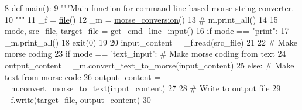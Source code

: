 \begin{DoxyCode}
8 \textcolor{keyword}{def }\mbox{\hyperlink{namespacemorse__main_a76d936650259b2059dd69cfe7a501ff8}{main}}():
9     \textcolor{stringliteral}{"""Main function for command line based morse string converter.}
10 \textcolor{stringliteral}{    """}
11     \_f = \mbox{\hyperlink{namespacefile}{file}}()
12     \_m = \mbox{\hyperlink{namespacemorse__conversion}{morse\_conversion}}()
13     \textcolor{comment}{# m.print\_all()}
14 
15     mode, src\_file, target\_file = get\_cmd\_line\_input()
16     \textcolor{keywordflow}{if} mode == \textcolor{stringliteral}{"print"}:
17         \_m.print\_all()
18         exit(0)
19 
20     input\_content = \_f.read(src\_file)
21 
22     \textcolor{comment}{# Make morse coding}
23     \textcolor{keywordflow}{if} mode == \textcolor{stringliteral}{'text\_input'}: \textcolor{comment}{# Make morse coding from text}
24         output\_content = \_m.convert\_text\_to\_morse(input\_content)
25     \textcolor{keywordflow}{else}:  \textcolor{comment}{# Make text from morse code}
26         output\_content = \_m.convert\_morse\_to\_text(input\_content)
27 
28     \textcolor{comment}{# Write to output file}
29     \_f.write(target\_file, output\_content)
30 
\end{DoxyCode}
